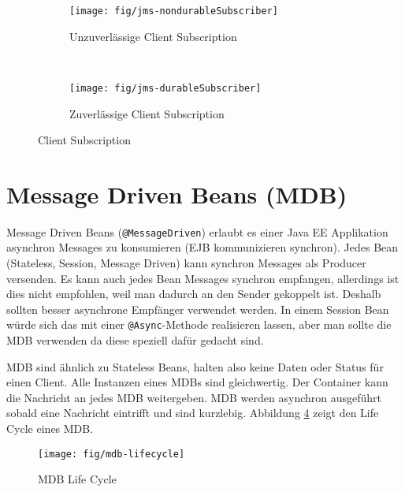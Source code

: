 \begin{figure}
	\centering
	\begin{subfigure}[b]{0.4\textwidth}
		\texttt{[image: fig/jms-nondurableSubscriber]}
		\caption{Unzuverlässige Client Subscription}
		\label{fig:jms-nondurable-subscriber}
	\end{subfigure}
	~
	\begin{subfigure}[b]{0.4\textwidth}
		\texttt{[image: fig/jms-durableSubscriber]}
		\caption{Zuverlässige Client Subscription}
		\label{fig:jms-durable-subscriber}
	\end{subfigure}
	\caption{Client Subscription}
\end{figure} 

\section{Message Driven Beans (MDB)}

Message Driven Beans (\verb|@MessageDriven|) erlaubt es einer Java EE Applikation asynchron Messages zu konsumieren (EJB kommunizieren synchron). Jedes Bean (Stateless, Session, Message Driven) kann synchron Messages als Producer versenden. Es kann auch jedes Bean Messages synchron empfangen, allerdings ist dies nicht empfohlen, weil man dadurch an den Sender gekoppelt ist. Deshalb sollten besser asynchrone Empfänger verwendet werden. In einem Session Bean würde sich das mit einer \verb|@Async|-Methode realisieren lassen, aber man sollte die MDB verwenden da diese speziell dafür gedacht sind.

MDB sind ähnlich zu Stateless Beans, halten also keine Daten oder Status für einen Client. Alle Instanzen eines MDBs sind gleichwertig. Der Container kann die Nachricht an jedes MDB weitergeben. MDB werden asynchron ausgeführt sobald eine Nachricht eintrifft und sind kurzlebig. Abbildung \ref{fig:mdb-lifecycle} zeigt den Life Cycle eines MDB.

\begin{figure}
\centering
\texttt{[image: fig/mdb-lifecycle]}
\caption{MDB Life Cycle}
\label{fig:mdb-lifecycle}
\end{figure}
